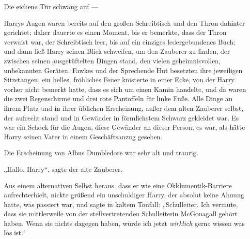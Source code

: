 Die eichene Tür schwang auf —

Harrys Augen waren bereits auf den großen Schreibtisch und den Thron dahinter gerichtet; daher dauerte es einen Moment, bis er bemerkte, dass der Thron verwaist war, der Schreibtisch leer, bis auf ein einziges ledergebundenes Buch; und dann ließ Harry seinen Blick schweifen, um den Zauberer zu finden, der zwischen seinen ausgetüftelten Dingen stand, den vielen geheimnisvollen, unbekannten Geräten. Fawkes und der Sprechende Hut besetzten ihre jeweiligen Sitzstangen, ein helles, fröhliches Feuer knisterte in einer Ecke, von der Harry vorher nicht bemerkt hatte, dass es sich um einen Kamin handelte, und da waren die zwei Regenschirme und drei rote Pantoffeln für linke Füße. Alle Dinge an ihrem Platz und in ihrer üblichen Erscheinung, außer dem alten Zauberer selbst, der aufrecht stand und in Gewänder in förmlichstem Schwarz gekleidet war. Es war ein Schock für die Augen, diese Gewänder an dieser Person, es war, als hätte Harry seinen Vater in einem Geschäftsanzug gesehen.

Die Erscheinung von Albus Dumbledore war sehr alt und traurig.

„Hallo, Harry“, sagte der alte Zauberer.

Aus einem alternativen Selbst heraus, dass er wie eine Okklumentik-Barriere aufrechterhielt, nickte grüßend ein unschuldiger Harry, der absolut keine Ahnung hatte, was passiert war, und sagte in kaltem Tonfall:
„Schulleiter. Ich vermute, dass sie mittlerweile von der stellvertretenden Schulleiterin McGonagall gehört haben. Wenn sie nichts dagegen haben, würde ich jetzt \emph{wirklich} gerne wissen was los ist.“

